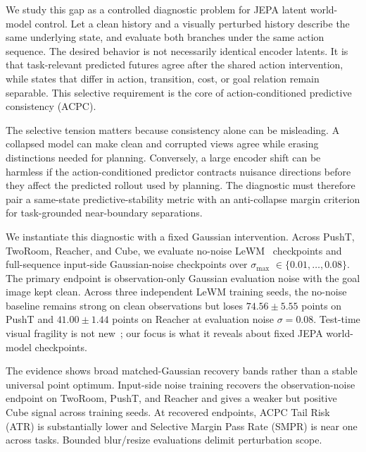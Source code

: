 \documentclass[10pt]{article}
\newcommand{\stdmax}{\ensuremath{\sigma_{\max}}}
\begin{document}
We study this gap as a controlled diagnostic problem for JEPA latent world-model control. Let a clean history and a visually perturbed history describe the same underlying state, and evaluate both branches under the same action sequence. The desired behavior is not necessarily identical encoder latents. It is that task-relevant predicted futures agree after the shared action intervention, while states that differ in action, transition, cost, or goal relation remain separable. This selective requirement is the core of action-conditioned predictive consistency (ACPC).

The selective tension matters because consistency alone can be misleading. A collapsed model can make clean and corrupted views agree while erasing distinctions needed for planning. Conversely, a large encoder shift can be harmless if the action-conditioned predictor contracts nuisance directions before they affect the predicted rollout used by planning. The diagnostic must therefore pair a same-state predictive-stability metric with an anti-collapse margin criterion for task-grounded near-boundary separations.

We instantiate this diagnostic with a fixed Gaussian intervention. Across PushT, TwoRoom, Reacher, and Cube, we evaluate no-noise LeWM~\cite{maes2026lewm} checkpoints and full-sequence input-side Gaussian-noise checkpoints over \stdmax{} $\in \{0.01,\dots,0.08\}$. The primary endpoint is observation-only Gaussian evaluation noise with the goal image kept clean. Across three independent LeWM training seeds, the no-noise baseline remains strong on clean observations but loses $74.56 \pm 5.55$ points on PushT and $41.00 \pm 1.44$ points on Reacher at evaluation noise $\sigma=0.08$. Test-time visual fragility is not new~\cite{kostrikov2020drq,yarats2022drqv2,hansen2021soda,vigmo}; our focus is what it reveals about fixed JEPA world-model checkpoints.

The evidence shows broad matched-Gaussian recovery bands rather than a stable universal point optimum. Input-side noise training recovers the observation-noise endpoint on TwoRoom, PushT, and Reacher and gives a weaker but positive Cube signal across training seeds. At recovered endpoints, ACPC Tail Risk (ATR) is substantially lower and Selective Margin Pass Rate (SMPR) is near one across tasks. Bounded blur/resize evaluations delimit perturbation scope.
\end{document}
